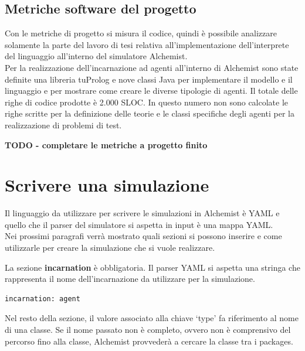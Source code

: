 \subsection{Metriche software del progetto}
Con le metriche di progetto si misura il codice, quindi è possibile analizzare solamente la parte del lavoro di tesi relativa all'implementazione dell'interprete del linguaggio all'interno del simulatore Alchemist.
\\
Per la realizzazione dell'incarnazione ad agenti all'interno di Alchemist sono state definite una libreria tuProlog e nove classi Java per implementare il modello e il linguaggio e per mostrare come creare le diverse tipologie di agenti. Il totale delle righe di codice prodotte è 2.000 SLOC. In questo numero non sono calcolate le righe scritte per la definizione delle teorie e le classi specifiche degli agenti per la realizzazione di problemi di test.

\textbf{TODO - completare le metriche a progetto finito}

\section{Scrivere una simulazione}\label{sctn:ScrivereUnaSimulazione}
\lstset{
  basicstyle=\ttfamily,
  captionpos=b,
  numbers=none,
  frame=tb,
}
Il linguaggio da utilizzare per scrivere le simulazioni in Alchemist è YAML e quello che il parser del simulatore si aspetta in input è una mappa YAML.
\\
Nei prossimi paragrafi verrà mostrato quali sezioni si possono inserire e come utilizzarle per creare la simulazione che si vuole realizzare.

La sezione \textbf{incarnation} è obbligatoria. Il parser YAML si aspetta una stringa che rappresenta il nome dell'incarnazione da utilizzare per la simulazione.
\medskip
\begin{lstlisting}[firstnumber=last, caption={Incarnazione}]
  incarnation: agent
\end{lstlisting}

Nel resto della sezione, il valore associato alla chiave `type' fa riferimento al nome di una classe. Se il nome passato non è completo, ovvero non è comprensivo del percorso fino alla classe, Alchemist provvederà a cercare la classe tra i packages.

